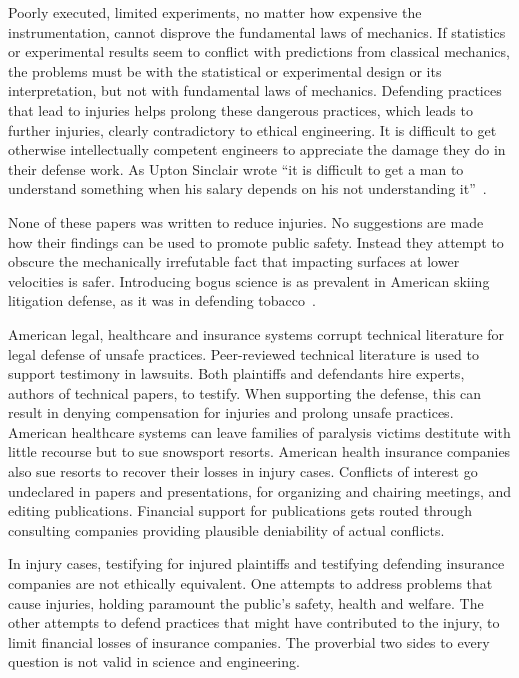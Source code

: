 \documentclass[smallextended]{svjour3}       %
\begin{document}
Poorly executed, limited experiments, no matter how expensive the instrumentation,
cannot disprove the fundamental laws of mechanics. If statistics or
experimental results seem to conflict with predictions from classical
mechanics, the problems must be with the statistical or experimental design or
its interpretation, but not with fundamental laws of mechanics. Defending
practices that lead to injuries helps prolong these dangerous practices, which
leads to further injuries, clearly contradictory to ethical engineering. It is
difficult to get otherwise intellectually competent engineers to appreciate the
damage they do in their defense work. As Upton Sinclair wrote ``it is difficult
to get a man to understand something when his salary depends on his not
understanding it''~\cite{Sinclair1994}.

None of these papers was written to reduce injuries. No suggestions
are made how their findings can be used to promote public safety. Instead they
attempt to obscure the mechanically irrefutable fact that impacting surfaces at
lower velocities is safer. Introducing bogus science is as prevalent in American
skiing litigation defense, as it was in defending tobacco~\cite{Oreskes2010}.

American legal, healthcare and insurance systems corrupt technical literature
for legal defense of unsafe practices. Peer-reviewed technical literature is
used to support testimony in lawsuits. Both plaintiffs and defendants hire
experts, authors of technical papers, to testify.  When supporting the
defense, this can result in denying compensation for injuries and prolong unsafe
practices. American healthcare systems can leave families of paralysis victims
 destitute with little recourse but to sue snowsport resorts. American
health insurance companies also sue resorts to recover their losses in injury
cases. Conflicts of interest go undeclared in papers and presentations, for
organizing and chairing meetings, and editing publications. Financial support for
publications gets routed through consulting companies providing plausible
deniability of actual conflicts.

In injury cases, testifying for injured plaintiffs and testifying defending
insurance companies are not ethically equivalent. One attempts to address
problems that cause injuries, holding paramount the public's safety, health and 
welfare. The other attempts to defend practices that might have
contributed to the injury, to limit financial losses of insurance
companies. The proverbial two sides to every question is not valid in science
and engineering.
\end{document}
